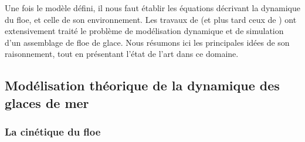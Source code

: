Une fois le modèle défini, il nous faut établir les équations décrivant la dynamique du floe, et celle de son environnement. Les travaux de \citeauthor{rabatel2015thesis} (et plus tard ceux de \citeauthor{balasoiu2020halthesis}) ont extensivement traité le problème de modélisation dynamique et de simulation d'un assemblage de floe de glace. Nous résumons ici les principales idées de son raisonnement, tout en présentant l'état de l'art dans ce domaine.

\subsection{Modélisation théorique de la dynamique des glaces de mer}

\subsubsection{La cinétique du floe}


